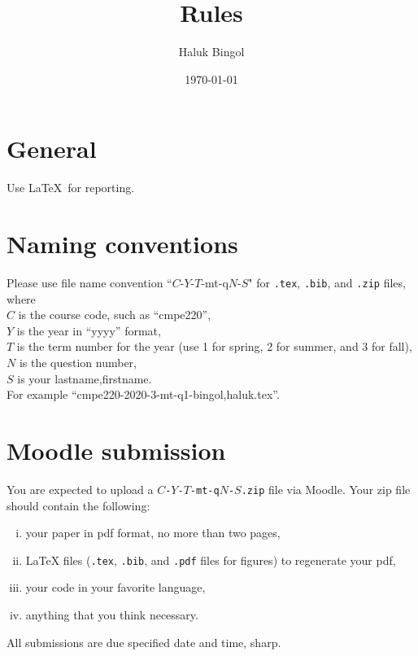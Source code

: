 \documentclass[11pt, oneside,twocolumn]{article}
\title{
	Rules
}
\author{Haluk Bingol}
\date{\today}
\newcommand{\hCode}[1]{\texttt{#1}}
\theoremstyle{plain}
\theoremstyle{definition}
\theoremstyle{remark}
\begin{document}
\maketitle








\section{General}

Use \LaTeX\ for reporting.



\section{Naming conventions}

Please use file name convention ``$C$-$Y$-$T$-mt-q$N$-$S$" 
for 
\hCode{.tex}, 
\hCode{.bib}, and 
\hCode{.zip} files,
where\\
$C$ is the course code, such as ``cmpe220'',\\
$Y$ is the year in ``yyyy'' format,\\
$T$ is the term number for the year (use 1 for spring, 2 for summer, and 3 for fall),\\
$N$ is the question number,\\
$S$ is your lastname,firstname.\\
For example
``cmpe220-2020-3-mt-q1-bingol,haluk.tex''.


\section{Moodle submission}

You are expected to upload a \hCode{$C$-$Y$-$T$-mt-q$N$-$S$.zip} file via Moodle.
Your zip file should contain the following:
\begin{enumerate}[i.]
	
	\item 
	your paper in pdf format, no more than two pages,
	
	\item
	LaTeX files (\hCode{.tex}, 
	\hCode{.bib}, and 
	\hCode{.pdf} files for figures) to regenerate your pdf,
	
	\item
	your code in your favorite language,
	
	\item
	anything that you think necessary.
	
\end{enumerate}

All submissions are due 
specified date and time, sharp.

\end{document}
